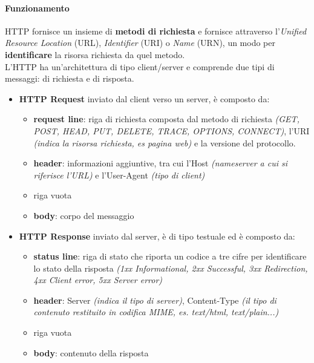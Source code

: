 \documentclass[a4paper,11pt]{article}
\begin{document}
\paragraph{Funzionamento} HTTP fornisce un insieme di \textbf{metodi di richiesta} e fornisce attraverso l'\textit{Unified Resource Location} (URL), \textit{Identifier} (URI) o \textit{Name} (URN), un modo per \textbf{identificare} la risorsa richiesta da quel metodo. \\
L'HTTP ha un'architettura di tipo client/server e comprende due tipi di messaggi: di richiesta e di risposta.
\begin{itemize}
\item \textbf{HTTP Request} inviato dal client verso un server, è composto da:
\begin{itemize}
\item \textbf{request line}: riga di richiesta composta dal metodo di richiesta \textit{(GET, POST, HEAD, PUT, DELETE, TRACE, OPTIONS, CONNECT)}, l'URI \textit{(indica la risorsa richiesta, es pagina web)} e la versione del protocollo.
\item \textbf{header}: informazioni aggiuntive, tra cui l'Host \textit{(nameserver a cui si riferisce l'URL)} e l'User-Agent \textit{(tipo di client)}
\item riga vuota
\item \textbf{body}: corpo del messaggio
\end{itemize}
\item \textbf{HTTP Response} inviato dal server, è di tipo testuale ed è composto da:
\begin{itemize}
\item \textbf{status line}: riga di stato che riporta un codice a tre cifre per identificare lo stato della risposta \textit{(1xx Informational, 2xx Successful, 3xx Redirection, 4xx Client error, 5xx Server error)}
\item \textbf{header}: Server \textit{(indica il tipo di server)}, Content-Type \textit{(il tipo di contenuto restituito in codifica MIME, es. text/html, text/plain...)}
\item riga vuota
\item \textbf{body}: contenuto della risposta
\end{itemize}
\end{itemize}
\end{document}
